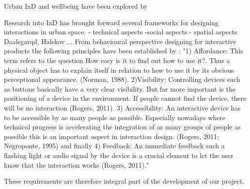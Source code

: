 Urban IxD and wellbeing have been explored by  


Research into IxD has brought forward several frameworks for designing interactions in urban space.
- technical aspects
-social aspects
- spatial aspects Daalsgarqd, Halskov ... 
From behavioural perspective designing for interactive products the following principles have been established by : "1) Affordance: This term refers to the question How easy is it to find out how to use it?. Thus a physical object has to explain itself in relation to how to use it by its obvious perceptional appearance. (Norman, 1988). 
2)Visibility: Controlling devices such as buttons basically have a very clear visibility. But far more important is the positioning of a device in the environment. If people cannot find the device, there will be no interaction (Rogers, 2011).
3) Accessibility: An interactive device has to be accessible by as many people as possible. Especially nowadays where technical progress is accelerating the integration of as many groups of people as possible this is an important aspect in interaction design. (Rogers, 2011; Negroponte, 1995)
and finally 4) Feedback: An immediate feedback such a flashing light or audio signal by the device is a crucial element to let the user know that the interaction works (Rogers, 2011)."	



These requirements are therefore integral part of the development of our project. 


